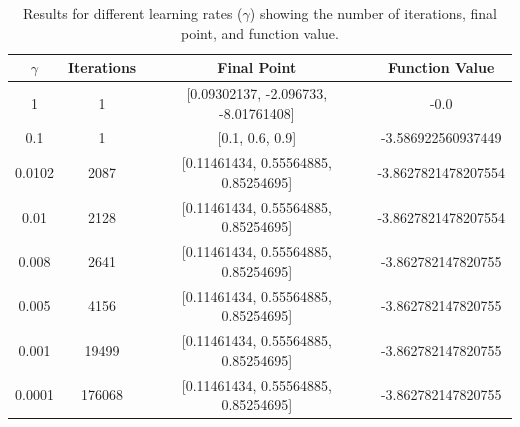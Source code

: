 \documentclass[9pt]{IEEEtran}
\begin{document}
         \begin{table}[h]
            \centering
            \begin{tabular}{c|c|c|c}
                \textbf{$\gamma$} & \textbf{Iterations} & \textbf{Final Point} & \textbf{Function Value} \\
                \hline
                1        & 1      & [0.09302137, -2.096733, -8.01761408]           & -0.0 \\
                0.1      & 1      & [0.1, 0.6, 0.9]                                & -3.586922560937449 \\
                0.0102   & 2087   & [0.11461434, 0.55564885, 0.85254695]           & -3.8627821478207554 \\
                0.01     & 2128   & [0.11461434, 0.55564885, 0.85254695]           & -3.8627821478207554 \\
                0.008    & 2641   & [0.11461434, 0.55564885, 0.85254695]           & -3.862782147820755 \\
                0.005    & 4156   & [0.11461434, 0.55564885, 0.85254695]           & -3.862782147820755 \\
                0.001    & 19499  & [0.11461434, 0.55564885, 0.85254695]           & -3.862782147820755 \\
                0.0001   & 176068 & [0.11461434, 0.55564885, 0.85254695]           & -3.862782147820755 \\
            \end{tabular}
            \caption{Results for different learning rates ($\gamma$) showing the number of iterations, final point, and function value.}
            \label{tab:res_6}
        \end{table}
\end{document}
